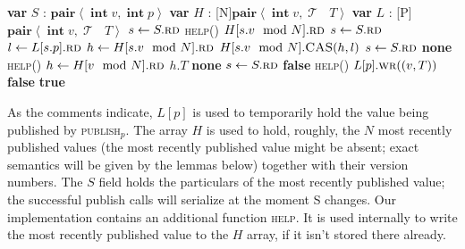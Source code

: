 \documentclass[a4paper,11pt]{article}
\def\none{\textbf{none} }
\def\T{\ensuremath{\operatorname{\mathcal{T}}}\text{ }}
\def\int{\ensuremath{\operatorname{\textbf{int}}}}
\newcommand{\fn}[1]{\textsc{#1}}
\newcommand{\var}[2]{\textbf{var }#1 : #2}
\newcommand{\arrayspec}[1]{\text{array}[#1]\text{ of }}
\begin{document}
\begin{algorithmic}[1]
	\State\var{$S$}{$\textbf{pair}\left<\int v, \int p\right>$} 
	\State\var{$H$}{\arrayspec{N}$\textbf{pair}\left<\int v, \T T\right>$} 
	\State\var{$L$}{\arrayspec{P}$\textbf{pair}\left<\int v, \T T\right>$} 
		\State $s \gets S.\fn{rd}$ 
		\State \fn{help}()
		\State \Return $H[s.v \mod N].\fn{rd}$
	\EndFunction
		\State $s \gets S.\fn{rd}$
		\State $l \gets L[s.p].\fn{rd}$
		\State $h \gets H[s.v \mod N].\fn{rd}$
		\State $H[s.v \mod N].\fn{CAS}(h, l)$ \label{hist-help-cas}
		\EndIf
	\EndFunction
	\State $s \gets S.\fn{rd}$ \label{hist-get-notyet-sp} 
		\State \Return \none \label{hist-get-notyet} 
		\EndIf
		\State \fn{help}()
		\State $h \gets H[v \mod N].\fn{rd}$
			\State \Return $h.T$
		\Else
			\State \Return \none \label{hist-get-tooold}
		\EndIf
	\EndFunction
		\State $s \gets S.\fn{rd}$ \label{hist-pub-earlier-sp} 
			\State \Return \textbf{false} \label{hist-pub-earlier-exit}
		\EndIf
		\State \fn{help}()
		\State $L[p].\fn{wr}((v, T))$ \label{hist-pub-latest}
		\If{$S.\fn{CAS}(s, (v, p)$) \textbf{failed}} \label{hist-pub-later-sp}
			\State \Return \textbf{false}
		\EndIf
		\State \Return \textbf{true}
	\EndFunction
\end{algorithmic}

As the comments indicate, $L[p]$ is used to temporarily hold the value being published by \fn{publish$_p$}. The array $H$ is used to hold, roughly,
the $N$ most recently published values (the most recently published value might be absent; exact semantics will be given by the lemmas below) together with their version numbers. The $S$ field holds the particulars of the most recently published value; the successful publish calls will serialize at the moment S changes. Our implementation contains an additional function \fn{help}. It is used internally to write the most recently published value to the $H$ array, if it isn't stored there already.
\end{document}
